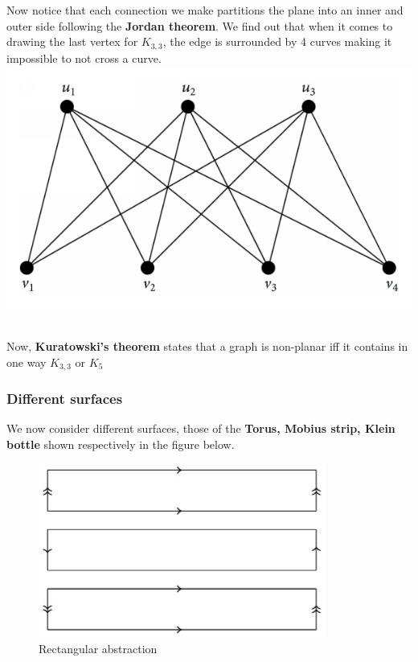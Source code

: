 \documentclass[titlepage]{article}
\theoremstyle{definition}
\numberwithin{equation}{subsection}
\numberwithin{remark}{subsection}
\begin{document}
 
 \begin{tcolorbox}[drop shadow, title=($K_{3,3}$ and $K_{5}$ are not planar),lower separated=true]
    Now notice that each connection we make partitions the plane into an inner and outer side following the \textbf{Jordan theorem}. We find out that when it comes to drawing the last vertex for $K_{3,3}$, the edge is surrounded by 4 curves making it impossible to not cross a curve. 
    \tcblower
    \centering
        \includegraphics[scale = 1.1,valign=t]{epflLectureNotes/advancedComputation/figures/k3.png}
\end{tcolorbox}
\\
Now, \textbf{Kuratowski's theorem} states that a graph is non-planar iff it contains in one way $K_{3,3}$ or $K_{5}$
\clearpage
\subsubsection{Different surfaces}
We now consider different surfaces, those of the \textbf{Torus, Mobius strip, Klein bottle} shown respectively in the figure below. 

\begin{figure}[H]
    \centering
    \includegraphics{epflLectureNotes/advancedComputation/figures/mobius.JPG}
    \caption{Rectangular abstraction}
\end{figure}
\end{document}

